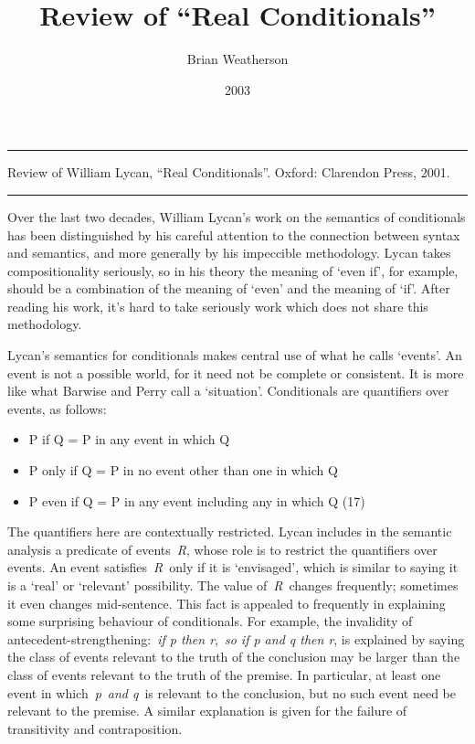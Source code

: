 \documentclass[
  10pt,
  letterpaper,
  DIV=11,
  numbers=noendperiod,
  twoside]{scrartcl}
\title{Review of ``Real Conditionals''}
\author{Brian Weatherson}
\date{2003}
\providecommand{\tightlist}{%
  \setlength{\itemsep}{0pt}\setlength{\parskip}{0pt}}\usepackage{longtable,booktabs,array}
\renewenvironment{abstract}
 {\vspace{-1.25cm}
 \quotation\small\noindent\rule{\linewidth}{.5pt}\par\smallskip
 \noindent }
 {\par\noindent\rule{\linewidth}{.5pt}\endquotation}
\begin{document}
\maketitle
\begin{abstract}
Review of William Lycan, ``Real Conditionals''. Oxford: Clarendon Press,
2001.
\end{abstract}

Over the last two decades, William Lycan's work on the semantics of
conditionals has been distinguished by his careful attention to the
connection between syntax and semantics, and more generally by his
impeccible methodology. Lycan takes compositionality seriously, so in
his theory the meaning of `even if', for example, should be a
combination of the meaning of `even' and the meaning of `if'. After
reading his work, it's hard to take seriously work which does not share
this methodology.

Lycan's semantics for conditionals makes central use of what he calls
`events'. An event is not a possible world, for it need not be complete
or consistent. It is more like what Barwise and Perry call a
`situation'. Conditionals are quantifiers over events, as follows:

\begin{itemize}
\tightlist
\item
  P if Q = P in any event in which Q
\item
  P only if Q = P in no event other than one in which Q
\item
  P even if Q = P in any event including any in which Q (17)
\end{itemize}

The quantifiers here are contextually restricted. Lycan includes in the
semantic analysis a predicate of events~\emph{R}, whose role is to
restrict the quantifiers over events. An event satisfies~\emph{R}~only
if it is `envisaged', which is similar to saying it is a `real' or
`relevant' possibility. The value of~\emph{R}~changes frequently;
sometimes it even changes mid-sentence. This fact is appealed to
frequently in explaining some surprising behaviour of conditionals. For
example, the invalidity of antecedent-strengthening:~\emph{if p then
r},~\emph{so if p and q then r}, is explained by saying the class of
events relevant to the truth of the conclusion may be larger than the
class of events relevant to the truth of the premise. In particular, at
least one event in which~\emph{p}~\emph{and q}~is relevant to the
conclusion, but no such event need be relevant to the premise. A similar
explanation is given for the failure of transitivity and contraposition.
\end{document}
